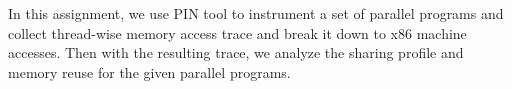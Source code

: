 

In this assignment, we use PIN tool to instrument a set of parallel programs and collect
thread-wise memory access trace and break it down to x86 machine accesses. Then with the resulting trace,
we analyze the sharing profile and memory reuse for the given parallel programs.